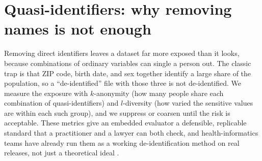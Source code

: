 \documentclass[
    a4paper,
    fontsize=10pt,
    twoside=true,
    numbers=noenddot,
]{kaobook}
\begin{document}
\section{Quasi-identifiers: why removing names is not enough}\label{sec:qid}
Removing direct identifiers leaves a dataset far more exposed than it looks, because combinations of ordinary variables can single a person out. The classic trap is that ZIP code, birth date, and sex together identify a large share of the population, so a \enquote{de-identified} file with those three is not de-identified. We measure the exposure with $k$-anonymity (how many people share each combination of quasi-identifiers) and $l$-diversity (how varied the sensitive values are within each such group), and we suppress or coarsen until the risk is acceptable. These metrics give an embedded evaluator a defensible, replicable standard that a practitioner and a lawyer can both check, and health-informatics teams have already run them as a working de-identification method on real releases, not just a theoretical ideal \parencite{elemam2008kanon}.
\end{document}

